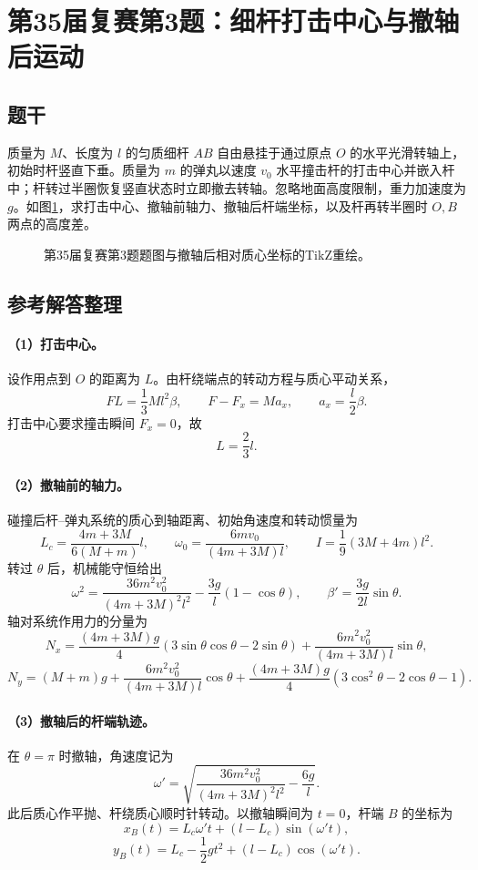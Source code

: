 \section{第35届复赛第3题：细杆打击中心与撤轴后运动}
\subsection{题干}
质量为 $M$、长度为 $l$ 的匀质细杆 $AB$ 自由悬挂于通过原点 $O$ 的水平光滑转轴上，初始时杆竖直下垂。质量为 $m$ 的弹丸以速度 $v_0$ 水平撞击杆的打击中心并嵌入杆中；杆转过半圈恢复竖直状态时立即撤去转轴。忽略地面高度限制，重力加速度为 $g$。如图\ref{fig:cpho35q03}，求打击中心、撤轴前轴力、撤轴后杆端坐标，以及杆再转半圈时 $O,B$ 两点的高度差。
\begin{figure}[htbp]\centering

\caption{第35届复赛第3题题图与撤轴后相对质心坐标的TikZ重绘。}\label{fig:cpho35q03}
\end{figure}

\subsection{参考解答整理}
\paragraph{（1）打击中心。} 设作用点到 $O$ 的距离为 $L$。由杆绕端点的转动方程与质心平动关系，
\[FL=\frac13Ml^2\beta,\qquad F-F_x=Ma_x,\qquad a_x=\frac l2\beta.\]
打击中心要求撞击瞬间 $F_x=0$，故
\[\boxed{L=\frac23l.}\]

\paragraph{（2）撤轴前的轴力。} 碰撞后杆--弹丸系统的质心到轴距离、初始角速度和转动惯量为
\[
L_c=\frac{4m+3M}{6(M+m)}l,\qquad
\omega_0=\frac{6mv_0}{(4m+3M)l},\qquad
I=\frac19(3M+4m)l^2.
\]
转过 $\theta$ 后，机械能守恒给出
\[
\omega^2=\frac{36m^2v_0^2}{(4m+3M)^2l^2}-\frac{3g}{l}(1-\cos\theta),
\qquad \beta'=\frac{3g}{2l}\sin\theta.
\]
轴对系统作用力的分量为
\[
N_x=\frac{(4m+3M)g}{4}(3\sin\theta\cos\theta-2\sin\theta)
+\frac{6m^2v_0^2}{(4m+3M)l}\sin\theta,
\]
\[
N_y=(M+m)g+\frac{6m^2v_0^2}{(4m+3M)l}\cos\theta
+\frac{(4m+3M)g}{4}(3\cos^2\theta-2\cos\theta-1).
\]

\paragraph{（3）撤轴后的杆端轨迹。} 在 $\theta=\pi$ 时撤轴，角速度记为
\[
\omega'=\sqrt{\frac{36m^2v_0^2}{(4m+3M)^2l^2}-\frac{6g}{l}}.
\]
此后质心作平抛、杆绕质心顺时针转动。以撤轴瞬间为 $t=0$，杆端 $B$ 的坐标为
\[
x_B(t)=L_c\omega't+(l-L_c)\sin(\omega't),
\]
\[
y_B(t)=L_c-\frac12gt^2+(l-L_c)\cos(\omega't).
\]

